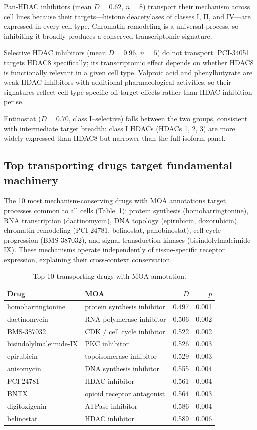 \documentclass[11pt]{article}
\begin{document}
Pan-HDAC inhibitors (mean $D = 0.62$, $n = 8$) transport their mechanism
across cell lines because their targets---histone deacetylases of classes
I, II, and IV---are expressed in every cell type. Chromatin remodeling is a
universal process, so inhibiting it broadly produces a conserved
transcriptomic signature.

Selective HDAC inhibitors (mean $D = 0.96$, $n = 5$) do not transport.
PCI-34051 targets HDAC8 specifically; its transcriptomic effect depends on
whether HDAC8 is functionally relevant in a given cell type. Valproic acid
and phenylbutyrate are weak HDAC inhibitors with additional pharmacological
activities, so their signatures reflect cell-type-specific off-target
effects rather than HDAC inhibition per se.

Entinostat ($D = 0.70$, class I--selective) falls between the two groups,
consistent with intermediate target breadth: class I HDACs (HDACs 1, 2, 3)
are more widely expressed than HDAC8 but narrower than the full isoform
panel.

\subsection{Top transporting drugs target fundamental machinery}

The 10 most mechanism-conserving drugs with MOA annotations target processes
common to all cells (Table~\ref{tab:top}): protein synthesis
(homoharringtonine), RNA transcription (dactinomycin), DNA topology
(epirubicin, doxorubicin), chromatin remodeling (PCI-24781, belinostat,
panobinostat), cell cycle progression (BMS-387032), and signal transduction
kinases (bisindolylmaleimide-IX). These mechanisms operate independently
of tissue-specific receptor expression, explaining their cross-context
conservation.

\begin{table}[t]
\centering
\caption{Top 10 transporting drugs with MOA annotation.}
\label{tab:top}
\small
\begin{tabular}{llrr}
\toprule
Drug & MOA & $D$ & $p$ \\
\midrule
homoharringtonine & protein synthesis inhibitor & 0.497 & 0.001 \\
dactinomycin & RNA polymerase inhibitor & 0.506 & 0.002 \\
BMS-387032 & CDK / cell cycle inhibitor & 0.522 & 0.002 \\
bisindolylmaleimide-IX & PKC inhibitor & 0.526 & 0.003 \\
epirubicin & topoisomerase inhibitor & 0.529 & 0.003 \\
anisomycin & DNA synthesis inhibitor & 0.555 & 0.004 \\
PCI-24781 & HDAC inhibitor & 0.561 & 0.004 \\
BNTX & opioid receptor antagonist & 0.564 & 0.003 \\
digitoxigenin & ATPase inhibitor & 0.586 & 0.004 \\
belinostat & HDAC inhibitor & 0.589 & 0.006 \\
\bottomrule
\end{tabular}
\end{table}
\end{document}
